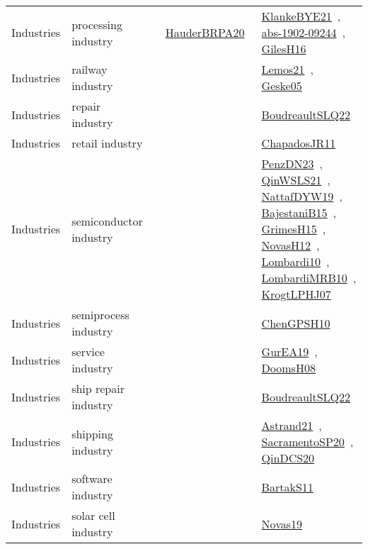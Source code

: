 {\begin{longtable}{lp{3cm}>{\raggedright\arraybackslash}p{6cm}>{\raggedright\arraybackslash}p{6cm}>{\raggedright\arraybackslash}p{8cm}}
Industries & processing industry &  & \href{../works/HauderBRPA20.pdf}{HauderBRPA20}~\cite{HauderBRPA20} & \href{../works/KlankeBYE21.pdf}{KlankeBYE21}~\cite{KlankeBYE21}, \href{../works/abs-1902-09244.pdf}{abs-1902-09244}~\cite{abs-1902-09244}, \href{../works/GilesH16.pdf}{GilesH16}~\cite{GilesH16}\\
Industries & railway industry &  &  & \href{../works/Lemos21.pdf}{Lemos21}~\cite{Lemos21}, \href{../works/Geske05.pdf}{Geske05}~\cite{Geske05}\\
Industries & repair industry &  &  & \href{../works/BoudreaultSLQ22.pdf}{BoudreaultSLQ22}~\cite{BoudreaultSLQ22}\\
Industries & retail industry &  &  & \href{../works/ChapadosJR11.pdf}{ChapadosJR11}~\cite{ChapadosJR11}\\
Industries & semiconductor industry &  &  & \href{../works/PenzDN23.pdf}{PenzDN23}~\cite{PenzDN23}, \href{../works/QinWSLS21.pdf}{QinWSLS21}~\cite{QinWSLS21}, \href{../works/NattafDYW19.pdf}{NattafDYW19}~\cite{NattafDYW19}, \href{../works/BajestaniB15.pdf}{BajestaniB15}~\cite{BajestaniB15}, \href{../works/GrimesH15.pdf}{GrimesH15}~\cite{GrimesH15}, \href{../works/NovasH12.pdf}{NovasH12}~\cite{NovasH12}, \href{../works/Lombardi10.pdf}{Lombardi10}~\cite{Lombardi10}, \href{../works/LombardiMRB10.pdf}{LombardiMRB10}~\cite{LombardiMRB10}, \href{../works/KrogtLPHJ07.pdf}{KrogtLPHJ07}~\cite{KrogtLPHJ07}\\
Industries & semiprocess industry &  &  & \href{../works/ChenGPSH10.pdf}{ChenGPSH10}~\cite{ChenGPSH10}\\
Industries & service industry &  &  & \href{../works/GurEA19.pdf}{GurEA19}~\cite{GurEA19}, \href{../works/DoomsH08.pdf}{DoomsH08}~\cite{DoomsH08}\\
Industries & ship repair industry &  &  & \href{../works/BoudreaultSLQ22.pdf}{BoudreaultSLQ22}~\cite{BoudreaultSLQ22}\\
Industries & shipping industry &  &  & \href{../works/Astrand21.pdf}{Astrand21}~\cite{Astrand21}, \href{../works/SacramentoSP20.pdf}{SacramentoSP20}~\cite{SacramentoSP20}, \href{../works/QinDCS20.pdf}{QinDCS20}~\cite{QinDCS20}\\
Industries & software industry &  &  & \href{../works/BartakS11.pdf}{BartakS11}~\cite{BartakS11}\\
Industries & solar cell industry &  &  & \href{../works/Novas19.pdf}{Novas19}~\cite{Novas19}\\

\end{longtable}}
